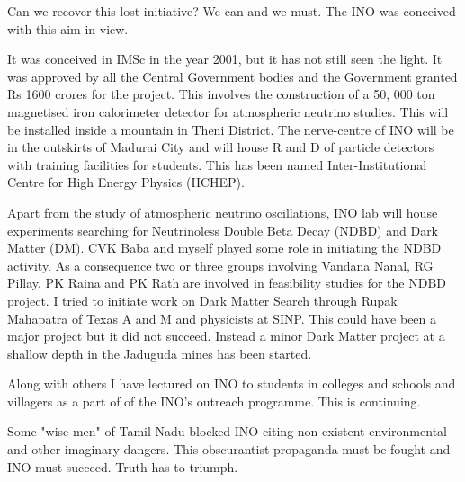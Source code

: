 Can we recover this lost initiative? We can and we must. The INO was 
conceived with this aim in view.

It was conceived in IMSc in the year 2001, but it has not still seen the 
light. It was approved by all the Central Government bodies and the 
Government granted Rs 1600 crores for the project. This involves the 
construction of a 50, 000 ton magnetised iron calorimeter detector for 
atmospheric neutrino studies. This will be installed inside a mountain 
in Theni District. The nerve-centre of INO will be in the outskirts of 
Madurai City and will house R and D of particle detectors with training 
facilities for students. This has been named Inter-Institutional Centre 
for High Energy Physics (IICHEP).

Apart from the study of atmospheric neutrino oscillations, INO lab will 
house experiments searching for Neutrinoless Double Beta Decay (NDBD) 
and Dark Matter (DM). CVK Baba and myself played some role in initiating 
the NDBD activity. As a consequence two or three groups involving 
Vandana Nanal, RG Pillay, PK Raina and PK Rath are involved in 
feasibility studies for the NDBD project. I tried to initiate work on 
Dark Matter Search through Rupak Mahapatra of Texas A and M and 
physicists at SINP. This could have been a major project but it did not 
succeed. Instead a minor Dark Matter project at a shallow depth in the 
Jaduguda mines has been started.

Along with others I have lectured on INO to students in colleges and 
schools and villagers as a part of of the INO's outreach programme. This 
is continuing.

Some "wise men" of Tamil Nadu blocked INO citing non-existent 
environmental and other imaginary dangers. This obscurantist propaganda 
must be fought and INO must succeed. Truth has to triumph.

